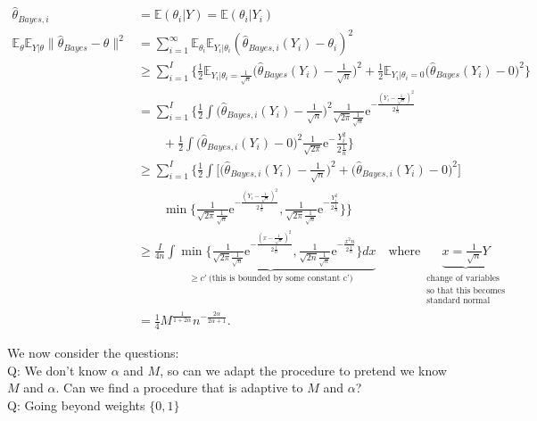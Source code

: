 \documentclass[twoside]{article}
\theoremstyle{definition}
\theoremstyle{definition}
\theoremstyle{remark}
\begin{document}
\[
\begin{aligned}
\hat\theta_{Bayes, i} &= \mathbb{E}(\theta_i | Y) = \mathbb{E} (\theta_i | Y_i) \\
\mathbb{E}_\theta \mathbb{E}_{Y|\theta} \| \hat\theta_{Bayes} - \theta \|^2 &= \sum \limits_{i=1}^\infty \mathbb{E}_{\theta_i} \mathbb{E}_{Y_i | \theta_i} (\hat\theta_{Bayes, i} (Y_i) - \theta_i)^2 \\
&\geq \sum \limits_{i=1}^I \Bigg\{ \frac{1}{2} \mathbb{E}_{Y_i | \theta_i = \frac{1}{\sqrt{n}}} \Bigg( \hat\theta_{Bayes} (Y_i) - \frac{1}{\sqrt{n}} \Bigg)^2 + \frac{1}{2} \mathbb{E}_{Y_i | \theta_i = 0} \Bigg( \hat\theta_{Bayes} (Y_i) - 0 \Bigg) ^2 \Bigg\} \\
&= \sum \limits_{i=1}^I \bigg\{ \frac{1}{2} \int \Bigg( \hat\theta_{Bayes, i} (Y_i) - \frac{1}{\sqrt{n}} \Bigg) ^2 \frac{1}{\sqrt{2\pi} \frac{1}{\sqrt{n}}} \mathrm{e}^{-\frac{(Y_i - \frac{1}{\sqrt{n}})^2}{2 \frac{1}{n}}} \\ & \quad \quad + \frac{1}{2} \int \Bigg( \hat\theta_{Bayes, i} (Y_i) - 0 \Bigg)^2 \frac{1}{\sqrt{2\pi}} \mathrm{e}^-\frac{Y_i^2}{2 \frac{1}{n}} \Bigg\} \\
&\geq \sum \limits_{i=1}^I \Bigg\{ \frac{1}{2} \int \Bigg[ \Bigg( \hat\theta_{Bayes, i} (Y_i) - \frac{1}{\sqrt{n}} \Bigg)^2 + \Bigg( \hat\theta_{Bayes, i} (Y_i) - 0 \Bigg)^2 \Bigg] \\ & \quad \quad \min \Bigg\{ \frac{1}{\sqrt{2\pi} \frac{1}{\sqrt{n}}} \mathrm{e}^{-\frac{(Y_i - \frac{1}{\sqrt{n}})^2}{2 \frac{1}{n}}}, \frac{1}{\sqrt{2\pi} \frac{1}{\sqrt{n}}} \mathrm{e}^{-\frac{Y_i^2}{2 \frac{1}{n}}} \Bigg\} \Bigg\} \\
&\geq \frac{I}{4n} \underbrace{\int \min \Bigg\{ \frac{1}{\sqrt{2\pi} \frac{1}{\sqrt{n}}} \mathrm{e}^{-\frac{(x - \frac{1}{\sqrt{n}})^2}{2 \frac{1}{n}}}, \frac{1}{\sqrt{2n} \frac{1}{\sqrt{n}}} \mathrm{e}^{-\frac{x^{2}n}{2 \frac{1}{n}}} \Bigg\} dx}_{\geq c' \ \text{(this is bounded by some constant c')}}\quad \text{where} \ \underbrace{x = \frac{1}{\sqrt{n}}Y}_{\substack{\text{change of variables} \\ \text{so that this becomes} \\ \text{standard normal}}}\\
&= \frac{1}{4} M^{\frac{1}{1+2\alpha}} n^{-\frac{2\alpha}{2\alpha+1}}.
\end{aligned}
\]

We now consider the questions: \\ Q: We don't know $\alpha$ and $M$, so can we adapt the procedure to pretend we know $M$ and $\alpha$. Can we find a procedure that is adaptive to $M$ and $\alpha$? \\ Q: Going beyond weights $\{ 0, 1 \}$
\end{document}
